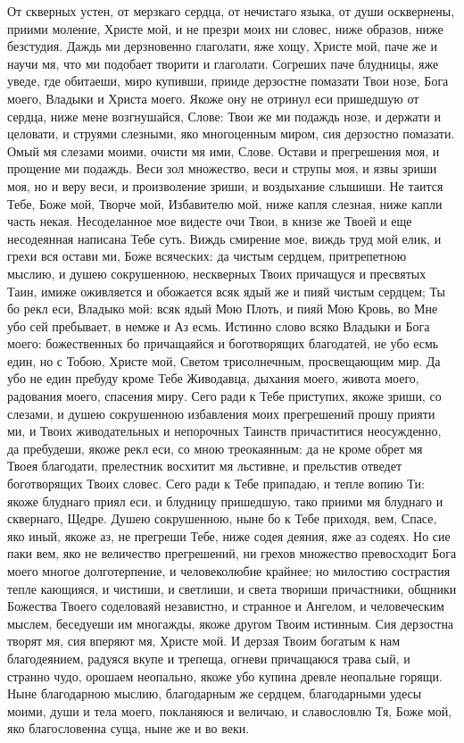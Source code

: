 \begin{mymulticols}

От скверных устен, от мерзкаго сердца, от нечистаго языка, от души осквернены, приими моление, Христе мой, и не презри моих ни словес, ниже образов, ниже безстудия. Даждь ми дерзновенно глаголати, яже хощу, Христе мой, паче же и научи мя, что ми подобает творити и глаголати. Согреших паче блудницы, яже уведе, где обитаеши, миро купивши, прииде дерзостне помазати Твои нозе, Бога моего, Владыки и Христа моего. Якоже ону не отринул еси пришедшую от сердца, ниже мене возгнушайся, Слове: Твои же ми подаждь нозе, и держати и целовати, и струями слезными, яко многоценным миром, сия дерзостно помазати. Омый мя слезами моими, очисти мя ими, Слове. Остави и прегрешения моя, и прощение ми подаждь. Веси зол множество, веси и струпы моя, и язвы зриши моя, но и веру веси, и произволение зриши, и воздыхание слышиши. Не таится Тебе, Боже мой, Творче мой, Избавителю мой, ниже капля слезная, ниже капли часть некая. Несоделанное мое видесте очи Твои, в книзе же Твоей и еще несодеянная написана Тебе суть. Виждь смирение мое, виждь труд мой елик, и грехи вся остави ми, Боже всяческих: да чистым сердцем, притрепетною мыслию, и душею сокрушенною, нескверных Твоих причащуся и пресвятых Таин, имиже оживляется и обожается всяк ядый же и пияй чистым сердцем; Ты бо рекл еси, Владыко мой: всяк ядый Мою Плоть, и пияй Мою Кровь, во Мне убо сей пребывает, в немже и Аз есмь. Истинно слово всяко Владыки и Бога моего: божественных бо причащаяйся и боготворящих благодатей, не убо есмь един, но с Тобою, Христе мой, Светом трисолнечным, просвещающим мир. Да убо не един пребуду кроме Тебе Живодавца, дыхания моего, живота моего, радования моего, спасения миру. Сего ради к Тебе приступих, якоже зриши, со слезами, и душею сокрушенною избавления моих прегрешений прошу прияти ми, и Твоих живодательных и непорочных Таинств причаститися неосужденно, да пребудеши, якоже рекл еси, со мною треокаянным: да не кроме обрет мя Твоея благодати, прелестник восхитит мя льстивне, и прельстив отведет боготворящих Твоих словес. Сего ради к Тебе припадаю, и тепле вопию Ти: якоже блуднаго приял еси, и блудницу пришедшую, тако приими мя блуднаго и сквернаго, Щедре. Душею сокрушенною, ныне бо к Тебе приходя, вем, Спасе, яко иный, якоже аз, не прегреши Тебе, ниже содея деяния, яже аз содеях. Но сие паки вем, яко не величество прегрешений, ни грехов множество превосходит Бога моего многое долготерпение, и человеколюбие крайнее; но милостию сострастия тепле кающияся, и чистиши, и светлиши, и света твориши причастники, общники Божества Твоего соделоваяй независтно, и странное и Ангелом, и человеческим мыслем, беседуеши им многажды, якоже другом Твоим истинным. Сия дерзостна творят мя, сия вперяют мя, Христе мой. И дерзая Твоим богатым к нам благодеянием, радуяся вкупе и трепеща, огневи причащаюся трава сый, и странно чудо, орошаем неопально, якоже убо купина древле неопальне горящи. Ныне благодарною мыслию, благодарным же сердцем, благодарными удесы моими, души и тела моего, покланяюся и величаю, и славословлю Тя, Боже мой, яко благословенна суща, ныне же и во веки.


\end{mymulticols}
